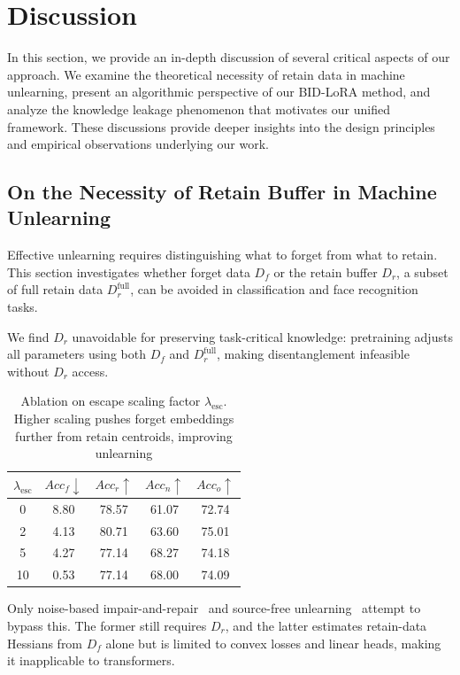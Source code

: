 \section{Discussion}
\label{8.0}
In this section, we provide an in-depth discussion of several critical aspects of our approach. We examine the theoretical necessity of retain data in machine unlearning, present an algorithmic perspective of our BID-LoRA method, and analyze the knowledge leakage phenomenon that motivates our unified framework. These discussions provide deeper insights into the design principles and empirical observations underlying our work.
\vspace{0.0cm}
\subsection{On the Necessity of Retain Buffer in Machine Unlearning}
\label{8.1}
Effective unlearning requires distinguishing what to forget from what to retain. This section investigates whether forget data $D_f$ or the retain buffer $D_r$, a subset of full retain data $D^\text{full}_r$, can be avoided in classification and face recognition tasks.

We find $D_r$ unavoidable for preserving task-critical knowledge: pretraining adjusts all parameters using both $D_f$ and $D^\text{full}_r$, making disentanglement infeasible without $D_r$ access.


\begin{table}[!htbp]
\centering
\caption{Ablation on escape scaling factor $\lambda_{\text{esc}}$. Higher scaling pushes forget embeddings further from retain centroids, improving unlearning}
\begin{tabular}{ccccc}
\toprule
$\lambda_{\text{esc}}$ & $Acc_f \downarrow$ & $Acc_r \uparrow$ & $Acc_n \uparrow$ & $Acc_o \uparrow$ \\
\midrule
0 & 8.80 & 78.57 & 61.07 & 72.74 \\
2 & 4.13 & 80.71 & 63.60 & 75.01 \\
5 & 4.27 & 77.14 & 68.27 & 74.18 \\
\rowcolor{orange!15}
10 & 0.53 & 77.14 & 68.00 & 74.09 \\
\bottomrule
\end{tabular}
\label{tab:escape_ablation}
\end{table}


Only noise-based impair-and-repair~\cite{tarun2023fast} and source-free unlearning~\cite{ahmed2025towards} attempt to bypass this. The former still requires $D_r$, and the latter estimates retain-data Hessians from $D_f$ alone but is limited to convex losses and linear heads, making it inapplicable to transformers.

